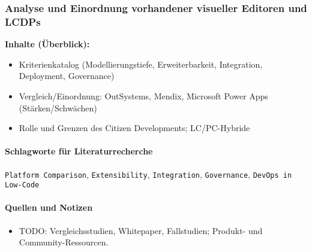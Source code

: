 \subsubsection{Analyse und Einordnung vorhandener visueller Editoren und LCDPs}\label{subsubsec:lcdp-analyse}
\textbf{Inhalte (Überblick):}
\begin{itemize}
  \item Kriterienkatalog (Modellierungstiefe, Erweiterbarkeit, Integration, Deployment, Governance)
  \item Vergleich/Einordnung: OutSystems, Mendix, Microsoft Power Apps (Stärken/Schwächen)
  \item Rolle und Grenzen des Citizen Developments; LC/PC-Hybride
\end{itemize}

\paragraph{Schlagworte für Literaturrecherche}
\texttt{Platform Comparison}, \texttt{Extensibility}, \texttt{Integration}, \texttt{Governance}, \texttt{DevOps in Low-Code}

\paragraph{Quellen und Notizen}
\begin{itemize}
  \item TODO: Vergleichsstudien, Whitepaper, Fallstudien; Produkt- und Community-Ressourcen.
\end{itemize}
